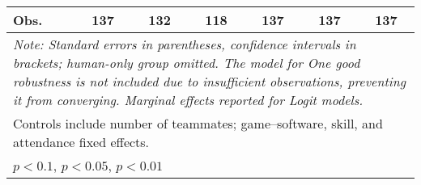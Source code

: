 \begin{tabular}{l*{6}{c}}
Obs.                &137   &132   &118   &137   &137   &137   \\
\hline
\hline\hline
\multicolumn{7}{p{0.8\textwidth}}{\it{Note:} Standard errors in parentheses, confidence intervals in brackets; human-only group omitted. The model for One good robustness is not included due to insufficient observations, preventing it from converging. Marginal effects reported for Logit models.}\\
\multicolumn{7}{l}{Controls include number of teammates; game--software, skill, and attendance fixed effects.}\\
\multicolumn{7}{l}{\sym{*} \(p<0.1\), \sym{**} \(p<0.05\), \sym{***} \(p<0.01\)}\\
\end{tabular}
